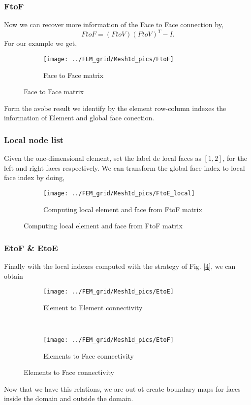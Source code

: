 \begin{frame} \frametitle{FtoF}
	Now we can recover more information of the Face to Face connection by,
	\begin{equation}
		FtoF = (FtoV)(FtoV)^T - I.
	\end{equation}
	For our example we get,
	\begin{figure}
		\centering
		\begin{subfigure}[b]{0.85\textwidth}
			\centering
			\texttt{[image: ../FEM\_grid/Mesh1d\_pics/FtoF]}
			\caption{Face to Face matrix}
			\label{fig:FtoF}
		\end{subfigure}%
	\end{figure}
	Form the avobe result we identify by the element row-column indexes the information of Element and global face conection.
\end{frame}

\begin{frame} \frametitle{Local node list}
	Given the one-dimensional element, set the label de local faces as $[1,2]$, for the left and right faces respectively.
	We can transform the global face index to local face index by doing,
	\begin{figure}
		\centering
		\begin{subfigure}[b]{0.50\textwidth}
			\centering
			\texttt{[image: ../FEM\_grid/Mesh1d\_pics/FtoE\_local]}
			\caption{Computing local element and face from FtoF matrix}
			\label{fig:FtoF_local}
		\end{subfigure}%
	\end{figure}
\end{frame}

\begin{frame} \frametitle{EtoF \& EtoE}
	Finally with the local indexes computed with the strategy of Fig. [\ref{fig:FtoF_local}], we can obtain
	\begin{figure}
        \centering
        \begin{subfigure}[b]{0.20\textwidth}
                \centering
                \texttt{[image: ../FEM\_grid/Mesh1d\_pics/EtoE]}
                \caption{Element to Element connectivity}
                \label{fig:EtoE}
        \end{subfigure}%
				~ %
        \begin{subfigure}[b]{0.20\textwidth}
                \centering
                \texttt{[image: ../FEM\_grid/Mesh1d\_pics/EtoF]}
                \caption{Elements to Face connectivity}
                \label{fig:EtoF}
				\end{subfigure}
				\label{fig:EtoE_and_EtoF}
	\end{figure}
	Now that we have this relations, we are out ot create boundary maps for faces inside the domain and outside the domain.
\end{frame}
